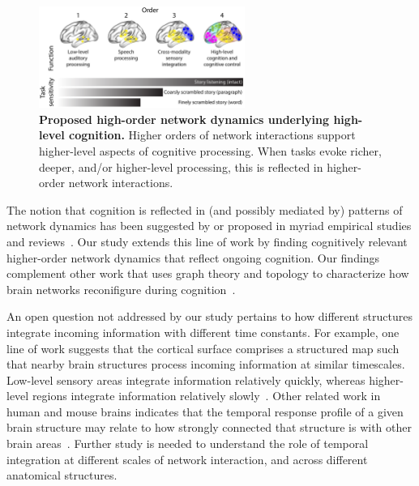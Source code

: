\documentclass[english]{article}
\begin{document}
\begin{figure}[tp]
  \centering
  \includegraphics[width=0.6\textwidth]{figs/discussion}
  \caption{\textbf{Proposed high-order network dynamics underlying
      high-level cognition.}
    Higher orders of network interactions support higher-level aspects
    of cognitive processing.  When tasks evoke richer, deeper, and/or
    higher-level processing, this is reflected in higher-order network
    interactions.}
  \label{fig:discussion}
\end{figure}

The notion that cognition is reflected in (and possibly mediated by)
patterns of network dynamics has been suggested by or proposed in
myriad empirical studies and reviews~\citep[e.g., ][]{DemeEtal19,
  Turk13, LuriEtal18, FongEtal19, ParkEtal18b, PretEtal17,
  RoyEtal19, LiegEtal19, ZouEtal19, ChanGlov10, GonzEtal19}.  Our
study extends this line of work by finding cognitively relevant
higher-order network dynamics that reflect ongoing cognition.  Our
findings complement other work that uses graph theory and topology to
characterize how brain networks reconifigure during
cognition~\citep[e.g., ][]{BassEtal06, ZhenEtal19, McInJirs19,
  TokeSomm19, SizeEtal18, ReimEtal17, BetzEtal19}.

An open question not addressed by our study pertains to how different
structures integrate incoming information with different time
constants.  For example, one line of work suggests that the cortical
surface comprises a structured map such that nearby brain structures
process incoming information at similar timescales.  Low-level sensory
areas integrate information relatively quickly, whereas higher-level
regions integrate information relatively slowly~\citep{BaldEtal17,
  HassEtal08, HassEtal15, HoneEtal12a, LernEtal11, LernEtal14}.  Other
related work in human and mouse brains indicates that the temporal
response profile of a given brain structure may relate to how strongly
connected that structure is with other brain
areas~\citep{FallEtal19}.  Further study is needed to understand the
role of temporal integration at different scales of network
interaction, and across different anatomical structures.
\end{document}
